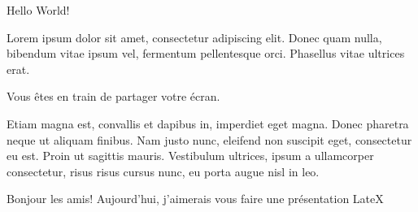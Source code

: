 \documentclass{article}
\begin{document}
Hello World!

Lorem ipsum dolor sit amet, consectetur adipiscing elit. Donec quam
nulla, bibendum vitae ipsum vel, fermentum pellentesque orci.
Phasellus vitae ultrices erat.

Vous êtes en train de partager votre écran.

	Etiam magna                      est, convallis et dapibus
in, imperdiet eget magna. Donec pharetra neque ut aliquam finibus. Nam
justo nunc, eleifend non suscipit eget, consectetur eu est. Proin ut
sagittis mauris. Vestibulum ultrices, ipsum a ullamcorper consectetur,
risus risus cursus nunc, eu porta augue nisl in leo.

Bonjour les amis! Aujourd'hui, j'aimerais vous faire une présentation LateX
\end{document}
